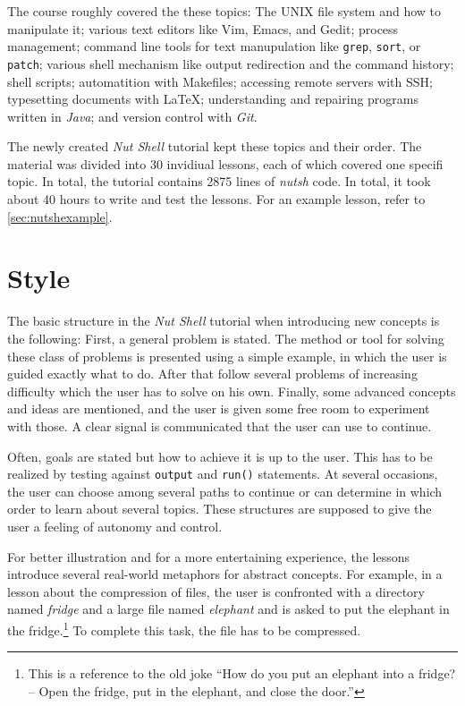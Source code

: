 \documentclass[paper=a4,twoside,abstract=on,cleardoublepage=empty,numbers=noenddot,toc=bib,12pt,appendixprefix=true]{scrreprt}
\begin{document}
The course roughly covered the these topics: The \textsc{UNIX} file system and how to manipulate it; various text editors like Vim, Emacs, and Gedit; process management; command line tools for text manupulation like \texttt{grep}, \texttt{sort}, or \texttt{patch}; various shell mechanism like output redirection and the command history; shell scripts; automatition with Makefiles; accessing remote servers with \textsc{SSH}; typesetting documents with \LaTeX; understanding and repairing programs written in \textit{Java}; and version control with \textit{Git}.

The newly created \textit{Nut Shell} tutorial kept these topics and their order. The material was divided into 30 invidiual lessons, each of which covered one specifi topic. In total, the tutorial contains 2875 lines of \textit{nutsh} code. In total, it took about 40 hours to write and test the lessons. For an example lesson, refer to \cref{sec:nutshexample}.

\section{Style}

The basic structure in the \emph{Nut Shell} tutorial when introducing new concepts is the following: First, a general problem is stated. The method or tool for solving these class of problems is presented using a simple example, in which the user is guided exactly what to do. After that follow several problems of increasing difficulty which the user has to solve on his own. Finally, some advanced concepts and ideas are mentioned, and the user is given some free room to experiment with those. A clear signal is communicated that the user can use to continue.

Often, goals are stated but how to achieve it is up to the user. This has to be realized by testing against \texttt{output} and \texttt{run()} statements. At several occasions, the user can choose among several paths to continue or can determine in which order to learn about several topics. These structures are supposed to give the user a feeling of autonomy and control.

For better illustration and for a more entertaining experience, the lessons introduce several real-world metaphors for abstract concepts. For example, in a lesson about the compression of files, the user is confronted with a directory named \textit{fridge} and a large file named \textit{elephant} and is asked to put the elephant in the fridge.\footnote{This is a reference to the old joke “How do you put an elephant into a fridge? -- Open the fridge, put in the elephant, and close the door.”} To complete this task, the file has to be compressed.
\end{document}
